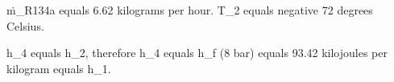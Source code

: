 ṁ_R134a equals 6.62 kilograms per hour.  
T_2 equals negative 72 degrees Celsius.  

h_4 equals h_2, therefore h_4 equals h_f (8 bar) equals 93.42 kilojoules per kilogram equals h_1.